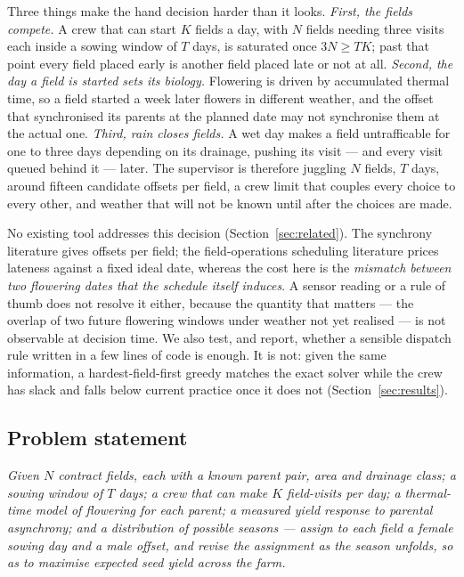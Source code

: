 \documentclass[10pt,twocolumn]{article}
\begin{document}
Three things make the hand decision harder than it looks.
\emph{First, the fields compete.} A crew that can start $K$ fields a day,
with $N$ fields needing three visits each inside a sowing window of $T$
days, is saturated once $3N \ge TK$; past that point every field placed
early is another field placed late or not at all.
\emph{Second, the day a field is started sets its biology.} Flowering is
driven by accumulated thermal time, so a field started a week later flowers
in different weather, and the offset that synchronised its parents at the
planned date may not synchronise them at the actual one.
\emph{Third, rain closes fields.} A wet day makes a field untrafficable for
one to three days depending on its drainage, pushing its visit --- and every
visit queued behind it --- later. The supervisor is therefore juggling
$N$ fields, $T$ days, around fifteen candidate offsets per field, a crew
limit that couples every choice to every other, and weather that will not
be known until after the choices are made.

No existing tool addresses this decision (Section~\ref{sec:related}). The
synchrony literature gives offsets per field; the field-operations
scheduling literature prices lateness against a fixed ideal date, whereas
the cost here is the \emph{mismatch between two flowering dates that the
schedule itself induces}. A sensor reading or a rule of thumb does not
resolve it either, because the quantity that matters --- the overlap of two
future flowering windows under weather not yet realised --- is not
observable at decision time. We also test, and report, whether a sensible
dispatch rule written in a few lines of code is enough. It is not: given the same information, a hardest-field-first greedy matches the exact solver while the crew has slack and falls below current practice once it does not (Section~\ref{sec:results}).

\subsection{Problem statement}

\emph{Given $N$ contract fields, each with a known parent pair, area and
drainage class; a sowing window of $T$ days; a crew that can make $K$
field-visits per day; a thermal-time model of flowering for each parent; a
measured yield response to parental asynchrony; and a distribution of
possible seasons --- assign to each field a female sowing day and a male
offset, and revise the assignment as the season unfolds, so as to maximise
expected seed yield across the farm.}
\end{document}
